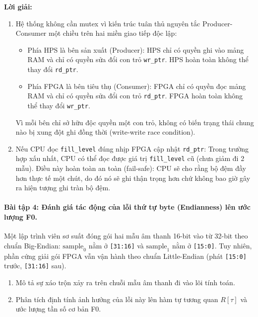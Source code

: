 \noindent\textbf{Lời giải:}
\begin{enumerate}[label=(\alph*), itemsep=2pt]
    \item Hệ thống không cần mutex vì kiến trúc tuân thủ nguyên tắc Producer-Consumer một chiều trên hai miền giao tiếp độc lập:
    \begin{itemize}[leftmargin=1.2em, itemsep=2pt]
        \item Phía HPS là bên sản xuất (Producer): HPS chỉ có quyền ghi vào mảng RAM và chỉ có quyền sửa đổi con trỏ \texttt{wr\_ptr}. HPS hoàn toàn không thể thay đổi \texttt{rd\_ptr}.
        \item Phía FPGA là bên tiêu thụ (Consumer): FPGA chỉ có quyền đọc mảng RAM và chỉ có quyền sửa đổi con trỏ \texttt{rd\_ptr}. FPGA hoàn toàn không thể thay đổi \texttt{wr\_ptr}.
    \end{itemize}
    Vì mỗi bên chỉ sở hữu độc quyền một con trỏ, không có biến trạng thái chung nào bị xung đột ghi đồng thời (write-write race condition).
    \item Nếu CPU đọc \texttt{fill\_level} đúng nhịp FPGA cập nhật \texttt{rd\_ptr}: Trong trường hợp xấu nhất, CPU có thể đọc được giá trị \texttt{fill\_level} cũ (chưa giảm đi 2 mẫu). Điều này hoàn toàn an toàn (fail-safe): CPU sẽ cho rằng bộ đệm đầy hơn thực tế một chút, do đó nó sẽ ghi thận trọng hơn chứ không bao giờ gây ra hiện tượng ghi tràn bộ đệm.
\end{enumerate}

\paragraph{Bài tập 4: Đánh giá tác động của lỗi thứ tự byte (Endianness) lên ước lượng F0.}
Một lập trình viên sơ suất đóng gói hai mẫu âm thanh 16-bit vào từ 32-bit theo chuẩn Big-Endian: $\text{sample}_0$ nằm ở \texttt{[31:16]} và $\text{sample}_1$ nằm ở \texttt{[15:0]}. Tuy nhiên, phần cứng giải gói FPGA vẫn vận hành theo chuẩn Little-Endian (phát \texttt{[15:0]} trước, \texttt{[31:16]} sau).
\begin{enumerate}[label=(\alph*), itemsep=2pt]
    \item Mô tả sự xáo trộn xảy ra trên chuỗi mẫu âm thanh đi vào lõi tính toán.
    \item Phân tích định tính ảnh hưởng của lỗi này lên hàm tự tương quan $R[\tau]$ và ước lượng tần số cơ bản F0.
\end{enumerate}

